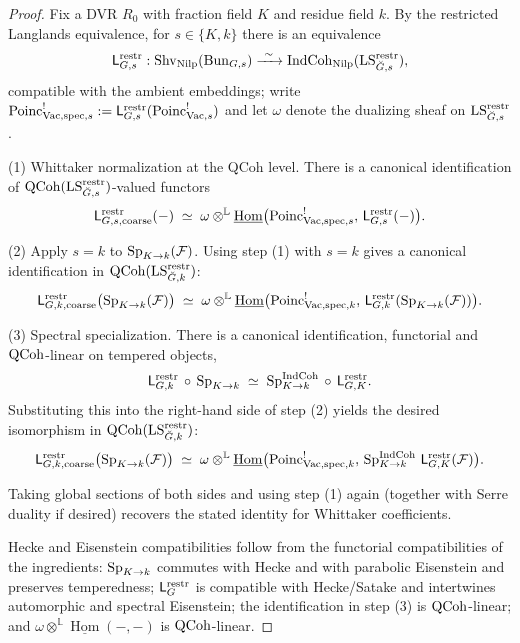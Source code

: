\begin{proof}
Fix a DVR $R_0$ with fraction field $K$ and residue field $k$. By the restricted Langlands equivalence, for $s\in\{K,k\}$ there is an equivalence
\[
\mathsf L^{\restr}_{G,s}:
\Shv_{\Nilp}(\Bun_{G,s})\xrightarrow{\ \sim\ }\IndCoh_{\Nilp}(\LS^{\restr}_{\breve G,s}),
\]
compatible with the ambient embeddings; write $\mathrm{Poinc}^{!}_{\mathrm{Vac},\mathrm{spec},s}:=\mathsf L^{\mathrm{restr}}_{G,s}(\mathrm{Poinc}^{!}_{\mathrm{Vac},s})$ and let $\omega$ denote the dualizing sheaf on $\mathrm{LS}^{\mathrm{restr}}_{\breve G,s}$.

(1) Whittaker normalization at the QCoh level. There is a canonical identification of $\mathrm{QCoh}(\mathrm{LS}^{\mathrm{restr}}_{\breve G,s})$-valued functors
\[
\mathsf L^{\mathrm{restr}}_{G,s,\mathrm{coarse}}(-)\;\simeq\;\omega\otimes^{\mathbb L}\underline{\operatorname{Hom}}\bigl(\mathrm{Poinc}^{!}_{\mathrm{Vac},\mathrm{spec},s},\,\mathsf L^{\mathrm{restr}}_{G,s}(-)\bigr).
\]

(2) Apply $s=k$ to $\operatorname{Sp}_{K\to k}(\mathcal F)$. Using step (1) with $s=k$ gives a canonical identification in $\mathrm{QCoh}(\mathrm{LS}^{\mathrm{restr}}_{\breve G,k})$:
\[
\mathsf L^{\mathrm{restr}}_{G,k,\mathrm{coarse}}\bigl(\operatorname{Sp}_{K\to k}(\mathcal F)\bigr)
\;\simeq\;
\omega\otimes^{\mathbb L}\underline{\operatorname{Hom}}\bigl(\mathrm{Poinc}^{!}_{\mathrm{Vac},\mathrm{spec},k},\,\mathsf L^{\mathrm{restr}}_{G,k}(\operatorname{Sp}_{K\to k}(\mathcal F))\bigr).
\]

(3) Spectral specialization. There is a canonical identification, functorial and $\mathrm{QCoh}$-linear on tempered objects,
\[
\mathsf L^{\mathrm{restr}}_{G,k}\mathrel{\mkern2mu\circ\mkern2mu}\allowbreak\operatorname{Sp}_{K\to k}
\;\simeq\;
\operatorname{Sp}^{\mathrm{IndCoh}}_{K\to k}\mathrel{\mkern2mu\circ\mkern2mu}\allowbreak\mathsf L^{\mathrm{restr}}_{G,K}.
\]
Substituting this into the right-hand side of step (2) yields the desired isomorphism in $\mathrm{QCoh}(\mathrm{LS}^{\mathrm{restr}}_{\breve G,k})$:
\[
\mathsf L^{\mathrm{restr}}_{G,k,\mathrm{coarse}}\bigl(\operatorname{Sp}_{K\to k}(\mathcal F)\bigr)
\;\simeq\;
\omega\otimes^{\mathbb L}\underline{\operatorname{Hom}}\bigl(\mathrm{Poinc}^{!}_{\mathrm{Vac},\mathrm{spec},k},\,\operatorname{Sp}^{\mathrm{IndCoh}}_{K\to k}\,\mathsf L^{\mathrm{restr}}_{G,K}(\mathcal F)\bigr).
\]

Taking global sections of both sides and using step (1) again (together with Serre duality if desired) recovers the stated identity for Whittaker coefficients.

Hecke and Eisenstein compatibilities follow from the functorial compatibilities of the ingredients: $\operatorname{Sp}_{K\to k}$ commutes with Hecke and with parabolic Eisenstein and preserves temperedness; $\mathsf L^{\mathrm{restr}}_G$ is compatible with Hecke/Satake and intertwines automorphic and spectral Eisenstein; the identification in step (3) is $\mathrm{QCoh}$-linear; and $\omega\otimes^{\mathbb L}\underline{\operatorname{Hom}}(-,-)$ is $\mathrm{QCoh}$-linear.
\end{proof}
